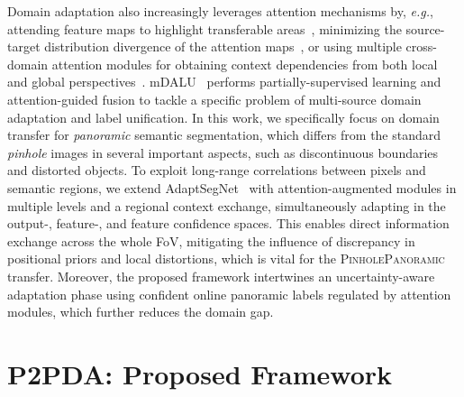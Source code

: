 \documentclass[journal]{IEEEtran}
\begin{document}

Domain adaptation also increasingly leverages attention mechanisms by, \textit{e.g.}, attending feature maps to highlight transferable areas~\cite{tada,safe},
minimizing the source-target distribution divergence of the attention maps~\cite{source_free}, or using multiple cross-domain attention modules for obtaining context dependencies from both local and global perspectives~\cite{contextaware}.
mDALU~\cite{gong2020mdalu} performs partially-supervised learning and attention-guided fusion to tackle a specific problem of multi-source domain adaptation and label unification.
In this work, we specifically focus on domain transfer for \emph{panoramic} semantic segmentation, which differs from the standard \emph{pinhole} images in several important aspects, such as discontinuous boundaries and distorted objects.
To exploit long-range correlations between pixels and semantic regions, we extend AdaptSegNet~\cite{adaptsegnet} with attention-augmented modules in multiple levels and a regional context exchange, simultaneously adapting in the output-, feature-, and feature confidence spaces.
This enables direct information exchange across the whole FoV, mitigating the influence of discrepancy in positional priors and local distortions, which is vital for the \textsc{PinholePanoramic} transfer.
Moreover, the proposed framework intertwines an uncertainty-aware adaptation phase using confident online panoramic labels regulated by attention modules, which further reduces the domain gap.

\section{P2PDA: Proposed Framework}
\end{document}
